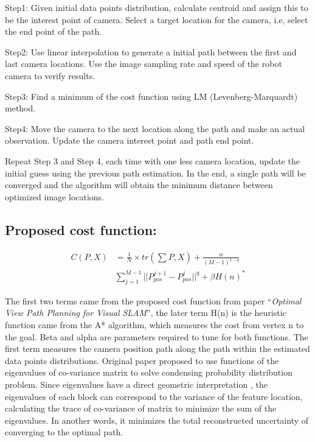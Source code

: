 \documentclass[letterpaper, 10 pt, conference]{IEEEtran}
\begin{document}
Step1: Given initial data points distribution, calculate centroid and assign
this to be the interest point of camera. Select a target location for the
camera, i.e, select the end point of the path.

Step2: Use linear interpolation to generate a initial path between the first and
last camera locations. Use the image sampling rate and speed of the robot camera
to verify results.

Step3: Find a minimum of the cost function using LM (Levenberg-Marquardt)
method.

Step4: Move the camera to the next location along the path and make an actual
observation. Update the camera interest point and path end point. 

Repeat Step 3 and Step 4, each time with one less camera location, update the
initial guess using the previous path estimation. In the end, a single path will
be converged and the algorithm will obtain the minimum distance between
optimized image locations.

\subsection{Proposed cost function:} \label{sect:\thesubsection}

\begin{equation}\begin{split}
C(P,X) &= \frac{1}{N} \times tr(\sum_{} P,X) + \frac{\alpha}{(M - 1)^{1 - q}}\\
&\sum_{j=1}^{M-1}||P_{pos}^{j+1} - P_{pos}^{j}||^q + \beta H(n)^*
\label{eq}
\end{split}\end{equation}

The first two terms came from the proposed cost function\cite{c18} from paper
``\textit{Optimal View Path Planning for Visual SLAM}'', the later term H(n) is
the heuristic function came from the A* algorithm, which measures the cost from
vertex n to the goal. Beta and alpha are parameters required to tune for both
functions. The first term measures the camera position path along the path
within the estimated data points distributions. Original paper proposed to use
functions of the eigenvalues of co-variance matrix to solve condensing
probability distribution problem. Since eigenvalues have a direct geometric
interpretation \cite{c18}, the eigenvalues of each block can correspond to the
variance of the feature location, calculating the trace of co-variance of matrix
to minimize the sum of the eigenvalues. In another words, it minimizes the total
reconstructed uncertainty of converging to the optimal path. 
\end{document}
